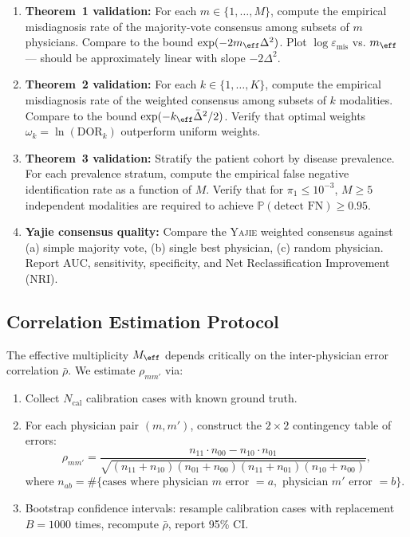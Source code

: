 \documentclass[11pt,a4paper]{article}
\theoremstyle{definition}
\newcommand{\Yajie}{\textsc{Yajie}}
\newcommand{\Pbb}{\mathbb{P}}
\newcommand{\misdiagnosis}{\varepsilon_{\text{mis}}}  %
\begin{document}
\begin{enumerate}[label=(\roman*)]
    \item \textbf{Theorem~1 validation:} For each $m \in \{1, \dots, M\}$,
    compute the empirical misdiagnosis rate of the majority-vote consensus
    among subsets of $m$ physicians. Compare to the bound
    $\exp(-2 m_{\eff} \Delta^2)$. Plot $\log \misdiagnosis$ vs. $m_{\eff}$
    --- should be approximately linear with slope $-2\Delta^2$.

    \item \textbf{Theorem~2 validation:} For each $k \in \{1, \dots, K\}$,
    compute the empirical misdiagnosis rate of the weighted consensus among
    subsets of $k$ modalities. Compare to the bound
    $\exp(-k_{\eff} \bar{\Delta}^2 / 2)$. Verify that optimal weights
    $\omega_k = \ln(\text{DOR}_k)$ outperform uniform weights.

    \item \textbf{Theorem~3 validation:} Stratify the patient cohort by
    disease prevalence. For each prevalence stratum, compute the empirical
    false negative identification rate as a function of $M$. Verify that
    for $\pi_1 \le 10^{-3}$, $M \ge 5$ independent modalities are required
    to achieve $\Pbb(\text{detect FN}) \ge 0.95$.

    \item \textbf{Yajie consensus quality:} Compare the \Yajie{} weighted
    consensus against (a) simple majority vote, (b) single best physician,
    (c) random physician. Report AUC, sensitivity, specificity, and
    Net Reclassification Improvement (NRI).
\end{enumerate}

\subsection{Correlation Estimation Protocol}

The effective multiplicity $M_{\eff}$ depends critically on the inter-physician
error correlation $\bar{\rho}$. We estimate $\rho_{mm'}$ via:

\begin{enumerate}[nosep]
    \item Collect $N_{\text{cal}}$ calibration cases with known ground truth.
    \item For each physician pair $(m, m')$, construct the $2 \times 2$
    contingency table of errors:
    \begin{equation}
        \rho_{mm'} = \frac{n_{11} \cdot n_{00} - n_{10} \cdot n_{01}}
                         {\sqrt{(n_{11}+n_{10})(n_{01}+n_{00})(n_{11}+n_{01})(n_{10}+n_{00})}},
    \end{equation}
    where $n_{ab} = \#\{\text{cases where physician } m \text{ error } = a,
    \text{ physician } m' \text{ error } = b\}$.
    \item Bootstrap confidence intervals: resample calibration cases with
    replacement $B = 1000$ times, recompute $\bar{\rho}$, report 95\% CI.
\end{enumerate}
\end{document}
